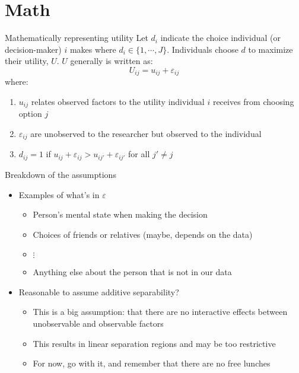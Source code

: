 \documentclass[english,aspectratio=169,12pt,xcolor=dvipsnames]{beamer}
\begin{document}
\section{Math}
\begin{frame}{Mathematically representing utility}
Let $d_i$ indicate the choice individual (or decision-maker) $i$ makes where $d_i\in\{1,\cdots, J\}$.
Individuals choose $d$ to maximize their utility, $U$.  $U$ generally is written as:
\begin{equation}
U_{ij}=u_{ij}+\varepsilon_{ij}
\end{equation}
where:
\begin{enumerate}
\item  $u_{ij}$ relates observed factors to the utility individual $i$ receives from choosing option $j$
\item $\varepsilon_{ij}$ are unobserved to the researcher but observed to the individual
\item $d_{ij}=1$ if $u_{ij}+\varepsilon_{ij}>u_{ij'}+\varepsilon_{ij'}$ for all $j'\neq j$
\end{enumerate}
\end{frame}



\begin{frame}{Breakdown of the assumptions}
\begin{itemize}
\item Examples of what's in $\varepsilon$
    \begin{itemize}
    \item Person's mental state when making the decision
    \item Choices of friends or relatives (maybe, depends on the data)
    \item $\vdots$
    \item Anything else about the person that is not in our data
    \end{itemize}
\item Reasonable to assume additive separability?
    \begin{itemize}
    \item This is a big assumption: that there are no interactive effects between unobservable and observable factors
    \item This results in linear separation regions and may be too restrictive
    \item For now, go with it, and remember that there are no free lunches
    \end{itemize}
\end{itemize}
\end{frame}
\end{document}
